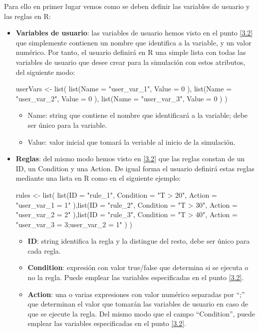 Para ello en primer lugar vemos como se deben definir las variables de usuario y las reglas en R:

\begin{itemize}
	\item \textbf{Variables de usuario}: las variables de usuario hemos visto en el punto \ref{3.2} que simplemente contienen un nombre que identifica a la variable, y un valor numérico. Por tanto, el usuario definirá en R una simple lista con todas las variables de usuario que desee crear para la simulación con estos atributos, del siguiente modo:

\begin{R}
userVars <- list(
        list(Name = "user_var_1",
            Value = 0
        ),
        list(Name = "user_var_2",
            Value = 0
        ),
        list(Name = "user_var_3",
            Value = 0
        )
    )
\end{R}

	\begin{itemize}
		\item Name: string que contiene el nombre que identificará a la variable; debe ser único para la variable.
		\item Value: valor inicial que tomará la veriable al inicio de la simulación.
	\end{itemize}

	\item \textbf{Reglas}: del mismo modo hemos visto en \ref{3.2} que las reglas constan de un ID, un Condition y una Action. De igual forma el usuario definirá estas reglas mediante una lista en R como en el siguiente ejemplo:

\begin{R}
rules <- list(
        list(ID = "rule_1",
            Condition = "T > 20",
            Action = "user_var_1 = 1"
        ),list(ID = "rule_2",
            Condition = "T > 30",
            Action = "user_var_2 = 2"
        ),list(ID = "rule_3",
            Condition = "T > 40",
            Action = "user_var_3 = 3;user_var_2 = 1"
        )
    )
\end{R}
	\begin{itemize}
		\item \textbf{ID}: string identifica la regla y la distingue del resto, debe ser único para cada regla.
		\item \textbf{Condition}: expresión con valor true/false que determina si se ejecuta o no la regla. Puede emplear las variables especificadas en el punto \ref{3.2}.
		\item \textbf{Action}: una o varias expresiones con valor numérico separadas por ``;'' que determinan el valor que tomarán las variables de usuario en caso de que se ejecute la regla. Del mismo modo que el campo ``Condition'', puede emplear las variables especificadas en el punto \ref{3.2}.
	\end{itemize}
\end{itemize}


